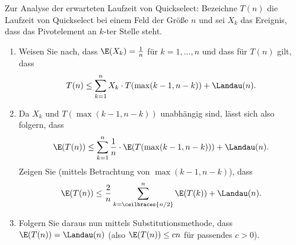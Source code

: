 
\begin{exercise}

Zur Analyse der erwarteten Laufzeit von Quickselect: Bezeichne $T(n)$ die Laufzeit
von Quickselect bei einem Feld der Größe $n$ und sei $X_k$ das Ereignis, dass das
Pivotelement an $k$-ter Stelle steht.
\begin{enumerate}[label = \alph*)]
  \item Weisen Sie nach, dass $\E(X_k) = \frac{1}{n}$ für $k = 1,\dots,n$ und dass
  für $T(n)$ gilt, dass
  \begin{align*}
    T(n) \leq \sum_{k=1}^n X_k \cdot T(\max(k-1,n-k)) + \Landau(n).
  \end{align*}
  \item Da $X_k$ und $T(\max(k-1,n-k))$ unabhängig sind, lässt sich also folgern, dass
  \begin{align*}
    \E(T(n)) \leq \sum_{k=1}^n \frac{1}{n} \cdot \E(T(\max(k-1,n-k))) + \Landau(n).
  \end{align*}
  Zeigen Sie (mittels Betrachtung von $\max(k-1,n-k)$), dass
  \begin{align*}
    \E(T(n)) \leq \frac{2}{n}\sum_{k=\ceilbraces{n/2}}^n \E(T(k)) + \Landau(n).
  \end{align*}
  \item Folgern Sie daraus nun mittels Substitutionsmethode, dass $\E(T(n)) = \Landau(n)$
  (also $\E(T(n)) \leq cn$ für passendes $c > 0$).
\end{enumerate}

\end{exercise}



